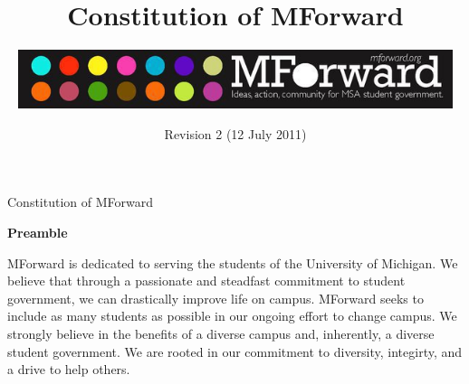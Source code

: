 \documentclass{constitution}
\begin{document}
	\renewcommand{\thepage}{\roman{page}}
	\title{Constitution of MForward}
	\author{\includegraphics[width=5in]{MForwardLogo.jpg}}
	\date{Revision 2 (12 July 2011)}
	\maketitle
	\tableofcontents
	\newpage

	\renewcommand{\thepage}{\arabic{page}}
	\setcounter{page}{1}
	\pagestyle{fancy}
	\headheight 35pt
	\linenumbers
	
	\begin{center}
		\Large Constitution of MForward
	\end{center}
	
	\begin{center}
		\bfseries Preamble
	\end{center}

MForward is dedicated to serving the students of the University of Michigan. We believe that through a passionate and steadfast commitment to student government, we can drastically improve life on campus. MForward seeks to include as many students as possible in our ongoing effort to change campus. We strongly believe in the benefits of a diverse campus and, inherently, a diverse student government. We are rooted in our commitment to diversity, integirty, and a drive to help others.
	

	

	
	
	
	
	
	
	
	
	
	

	
	
	
\end{document}
